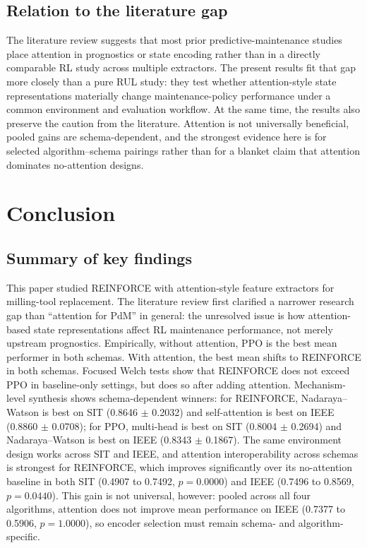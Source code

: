 \documentclass[sn-basic]{sn-jnl}%
\begin{document}
\subsection{Relation to the literature gap}
The literature review suggests that most prior predictive-maintenance studies place attention in prognostics or state encoding rather than in a directly comparable RL study across multiple extractors. The present results fit that gap more closely than a pure RUL study: they test whether attention-style state representations materially change maintenance-policy performance under a common environment and evaluation workflow. At the same time, the results also preserve the caution from the literature. Attention is not universally beneficial, pooled gains are schema-dependent, and the strongest evidence here is for selected algorithm--schema pairings rather than for a blanket claim that attention dominates no-attention designs.


\section{Conclusion} \label{sec:conclusion} %

\subsection{Summary of key findings}
This paper studied \textsc{REINFORCE} with attention-style feature extractors for milling-tool replacement. The literature review first clarified a narrower research gap than ``attention for PdM'' in general: the unresolved issue is how attention-based state representations affect RL maintenance performance, not merely upstream prognostics. Empirically, without attention, \textsc{PPO} is the best mean performer in both schemas. With attention, the best mean shifts to \textsc{REINFORCE} in both schemas. Focused Welch tests show that \textsc{REINFORCE} does not exceed \textsc{PPO} in baseline-only settings, but does so after adding attention. Mechanism-level synthesis shows schema-dependent winners: for \textsc{REINFORCE}, Nadaraya--Watson is best on SIT (0.8646 $\pm$ 0.2032) and self-attention is best on IEEE (0.8860 $\pm$ 0.0708); for \textsc{PPO}, multi-head is best on SIT (0.8004 $\pm$ 0.2694) and Nadaraya--Watson is best on IEEE (0.8343 $\pm$ 0.1867). The same environment design works across SIT and IEEE, and attention interoperability across schemas is strongest for \textsc{REINFORCE}, which improves significantly over its no-attention baseline in both SIT (0.4907 to 0.7492, $p=0.0000$) and IEEE (0.7496 to 0.8569, $p=0.0440$). This gain is not universal, however: pooled across all four algorithms, attention does not improve mean performance on IEEE (0.7377 to 0.5906, $p=1.0000$), so encoder selection must remain schema- and algorithm-specific.
\end{document}

